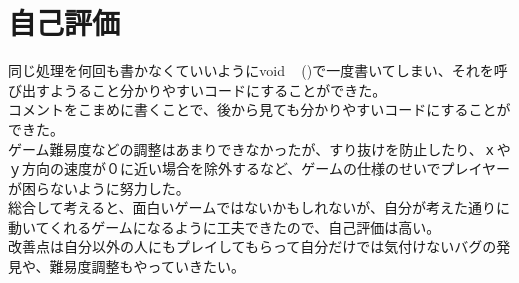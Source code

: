 \documentclass{jsarticle}
\begin{document}
\section{自己評価}
同じ処理を何回も書かなくていいようにvoid ~ (){}で一度書いてしまい、それを呼び出すようること分かりやすいコードにすることができた。\\
コメントをこまめに書くことで、後から見ても分かりやすいコードにすることができた。\\
ゲーム難易度などの調整はあまりできなかったが、すり抜けを防止したり、ｘやｙ方向の速度が０に近い場合を除外するなど、ゲームの仕様のせいでプレイヤーが困らないように努力した。\\
総合して考えると、面白いゲームではないかもしれないが、自分が考えた通りに動いてくれるゲームになるように工夫できたので、自己評価は高い。\\
改善点は自分以外の人にもプレイしてもらって自分だけでは気付けないバグの発見や、難易度調整もやっていきたい。\\
\end{document}
